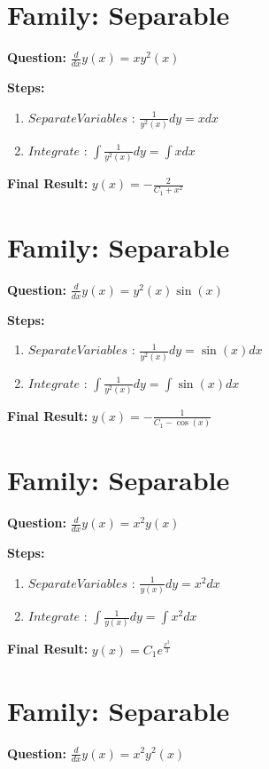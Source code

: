 \documentclass{article}
\begin{document}
\section*{Family: Separable}
\textbf{Question:} $\frac{d}{d x} y{\left(x \right)} = x y^{2}{\left(x \right)}$

\textbf{Steps:}
\begin{enumerate}
\item $Separate Variables$ :  $\frac{1}{y^{2}{\left(x \right)}} dy = x dx$
\item $Integrate$ :  $\int \frac{1}{y^{2}{\left(x \right)}} dy = \int x dx$
\end{enumerate}
\textbf{Final Result:} $y{\left(x \right)} = - \frac{2}{C_{1} + x^{2}}$

\section*{Family: Separable}
\textbf{Question:} $\frac{d}{d x} y{\left(x \right)} = y^{2}{\left(x \right)} \sin{\left(x \right)}$

\textbf{Steps:}
\begin{enumerate}
\item $Separate Variables$ :  $\frac{1}{y^{2}{\left(x \right)}} dy = \sin{\left(x \right)} dx$
\item $Integrate$ :  $\int \frac{1}{y^{2}{\left(x \right)}} dy = \int \sin{\left(x \right)} dx$
\end{enumerate}
\textbf{Final Result:} $y{\left(x \right)} = - \frac{1}{C_{1} - \cos{\left(x \right)}}$

\section*{Family: Separable}
\textbf{Question:} $\frac{d}{d x} y{\left(x \right)} = x^{2} y{\left(x \right)}$

\textbf{Steps:}
\begin{enumerate}
\item $Separate Variables$ :  $\frac{1}{y{\left(x \right)}} dy = x^{2} dx$
\item $Integrate$ :  $\int \frac{1}{y{\left(x \right)}} dy = \int x^{2} dx$
\end{enumerate}
\textbf{Final Result:} $y{\left(x \right)} = C_{1} e^{\frac{x^{3}}{3}}$

\section*{Family: Separable}
\textbf{Question:} $\frac{d}{d x} y{\left(x \right)} = x^{2} y^{2}{\left(x \right)}$
\end{document}
